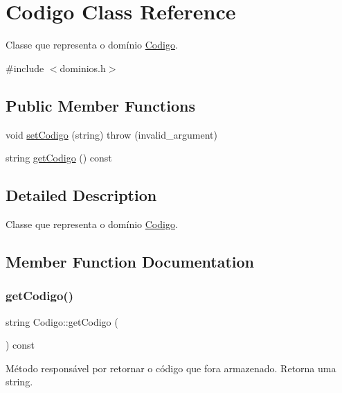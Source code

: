 \hypertarget{classCodigo}{}\section{Codigo Class Reference}
\label{classCodigo}


Classe que representa o domínio \hyperlink{classCodigo}{Codigo}.  




{\ttfamily \#include $<$dominios.\+h$>$}

\subsection*{Public Member Functions}
\begin{DoxyCompactItemize}
\item 
void \hyperlink{classCodigo_a863651a26dd7112dccced628aa96d86e}{set\+Codigo} (string)  throw (invalid\+\_\+argument)
\item 
string \hyperlink{classCodigo_ac263b3f7ff4f995fa72ad9101f1a8533}{get\+Codigo} () const
\end{DoxyCompactItemize}


\subsection{Detailed Description}
Classe que representa o domínio \hyperlink{classCodigo}{Codigo}. 

\subsection{Member Function Documentation}
\mbox{\label{classCodigo_ac263b3f7ff4f995fa72ad9101f1a8533}} 
\subsubsection{\texorpdfstring{get\+Codigo()}{getCodigo()}}
{\footnotesize\ttfamily string Codigo\+::get\+Codigo (\begin{DoxyParamCaption}{ }\end{DoxyParamCaption}) const\hspace{0.3cm}{\ttfamily [inline]}}

Método responsável por retornar o código que fora armazenado. Retorna uma string. \mbox{\label{classCodigo_a863651a26dd7112dccced628aa96d86e}} 
